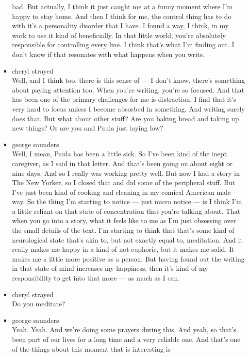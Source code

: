 \begin{itemize}
  bad. But actually, I think it just caught me at a funny moment where
  I'm happy to stay home. And then I think for me, the control thing has
  to do with it's a personality disorder that I have. I found a way, I
  think, in my work to use it kind of beneficially. In that little
  world, you're absolutely responsible for controlling every line. I
  think that's what I'm finding out. I don't know if that resonates with
  what happens when you write.
\item
  cheryl strayed\\
  Well, and I think too, there is this sense of --- I don't know,
  there's something about paying attention too. When you're writing,
  you're so focused. And that has been one of the primary challenges for
  me is distraction, I find that it's very hard to focus unless I become
  absorbed in something. And writing surely does that. But what about
  other stuff? Are you baking bread and taking up new things? Or are you
  and Paula just laying low?
\item
  george saunders\\
  Well, I mean, Paula has been a little sick. So I've been kind of the
  inept caregiver, as I said in that letter. And that's been going on
  about eight or nine days. And so I really was working pretty well. But
  now I had a story in The New Yorker, so I closed that and did some of
  the peripheral stuff. But I've just been kind of cooking and cleaning
  in my comical American male way. So the thing I'm starting to notice
  --- just micro notice --- is I think I'm a little reliant on that
  state of concentration that you're talking about. That when you go
  into a story, what it feels like to me as I'm just obsessing over the
  small details of the text. I'm starting to think that that's some kind
  of neurological state that's akin to, but not exactly equal to,
  meditation. And it really makes me happy in a kind of not euphoric,
  but it makes me solid. It makes me a little more positive as a person.
  But having found out the writing in that state of mind increases my
  happiness, then it's kind of my responsibility to get into that more
  --- as much as I can.
\item
  cheryl strayed\\
  Do you meditate?
\item
  george saunders\\
  Yeah. Yeah. And we're doing some prayers during this. And yeah, so
  that's been part of our lives for a long time and a very reliable one.
  And that's one of the things about this moment that is interesting is

\end{itemize}

